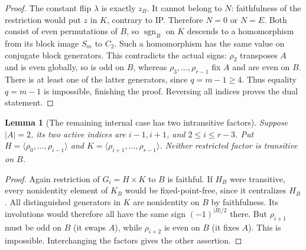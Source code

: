 \documentclass[11pt,a4paper]{article}
\newtheorem{lemma}{Lemma}
\newcommand{\gen}[1]{\langle#1\rangle}
\begin{document}
\begin{proof}
The constant flip $\lambda$ is exactly $z_B$. It cannot belong to
$N$: faithfulness of the restriction would put $z$ in $K$, contrary
to IP. Therefore $N=0$ or $N=E$. Both consist of even permutations
of $B$, so $\operatorname{sgn}_B$ on $K$ descends to a homomorphism
from its block image $S_m$ to $C_2$. Such a homomorphism has the same
value on conjugate block generators. This contradicts the actual
signs: $\rho_2$ transposes $A$ and is even globally, so is odd on
$B$, whereas $\rho_3,\ldots,\rho_{r-1}$ fix $A$ and are even on
$B$. There is at least one of the latter generators, since
$q=m-1\geq4$. Thus equality $q=m-1$ is impossible, finishing the
proof. Reversing all indices proves the dual statement.
\end{proof}

\begin{lemma}[The remaining internal case has two intransitive factors]
Suppose $|A|=2$, its two active indices are $i-1,i+1$, and
$2\leq i\leq r-3$. Put
$H=\gen{\rho_0,\ldots,\rho_{i-1}}$ and
$K=\gen{\rho_{i+1},\ldots,\rho_{r-1}}$.
Neither restricted factor is transitive on $B$.
\end{lemma}
\begin{proof}
Again restriction of $G_i=H\times K$ to $B$ is faithful. If $H_B$
were transitive, every nonidentity element of $K_B$ would be
fixed-point-free, since it centralizes $H_B$. All distinguished
generators in $K$ are nonidentity on $B$ by faithfulness. Its
involutions would therefore all have the same sign
$(-1)^{|B|/2}$ there. But $\rho_{i+1}$ must be odd on $B$ (it
swaps $A$), while $\rho_{i+2}$ is even on $B$ (it fixes $A$).
This is impossible. Interchanging the factors gives the other
assertion.
\end{proof}
\end{document}
